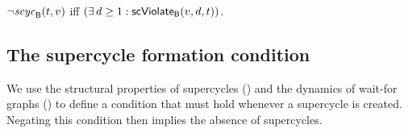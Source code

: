 






\bp \label{prop:scViol-iff-notInSC}
$\neg \mathit{scyc}_{\mathsf{B}}({t, v})$ iff $(\exists\, d \ge 1: \mathsf{scViolate}_{\mathsf{B}}(v,d,t))$.
\ep





\subsection{The supercycle formation condition}

We use the structural properties of supercycles () and the 
dynamics of wait-for graphs () to define a condition that 
must hold whenever a supercycle is created. Negating this condition then implies the absence of
supercycles. 


